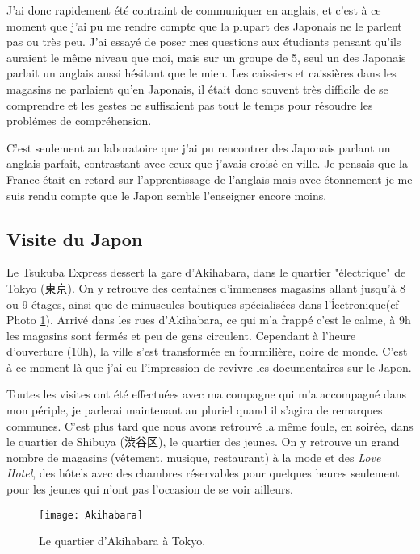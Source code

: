 \documentclass[11pt,journal]{RapportFR}
\begin{document}
\begin{CJK*}{UTF8}{min}
J'ai donc rapidement \'et\'e contraint de communiquer en anglais, et c'est \`a ce moment que j'ai pu me rendre compte que la plupart des Japonais ne le parlent pas ou tr\`es peu. J'ai essay\'e de poser mes questions aux \'etudiants pensant qu'ils auraient le m\^eme niveau que moi, mais sur un groupe de 5, seul un des Japonais parlait un anglais aussi h\'esitant que le mien. Les caissiers et caissi\`eres dans les magasins ne parlaient qu'en Japonais, il \'etait donc souvent tr\`es difficile de se comprendre et les gestes ne suffisaient pas tout le temps pour r\'esoudre les probl\'emes de compr\'ehension.

C'est seulement au laboratoire que j'ai pu rencontrer des Japonais parlant un anglais parfait, contrastant avec ceux que j'avais crois\'e en ville.
Je pensais que la France \'etait en retard sur l'apprentissage de l'anglais mais avec \'etonnement je me suis rendu compte que le Japon semble l'enseigner encore moins. 


\subsection{Visite du Japon}

Le Tsukuba Express dessert la gare d'Akihabara, dans le quartier "\'electrique" de Tokyo (東京). On y retrouve des centaines d'immenses magasins allant jusqu'\`a 8 ou 9 \'etages, ainsi que de minuscules boutiques sp\'ecialis\'ees dans l'\'lectronique(cf Photo \ref{fig_akihabara}).
Arriv\'e dans les rues d'Akihabara, ce qui m'a frapp\'e c'est le calme, \`a 9h les magasins sont ferm\'es et peu de gens circulent. Cependant \`a l'heure d'ouverture (10h), la ville s'est transform\'ee en fourmili\`ere, noire de monde. C'est \`a ce moment-l\`a que j'ai eu l'impression de revivre les documentaires sur le Japon.

Toutes les visites ont \'et\'e effectu\'ees avec ma compagne qui m'a accompagn\'e dans mon p\'eriple, je parlerai maintenant au pluriel quand il s'agira de remarques communes. C'est plus tard que nous avons retrouv\'e la m\^eme foule, en soir\'ee, dans le quartier de Shibuya (渋谷区), le quartier des jeunes. On y retrouve un grand nombre de magasins (v\^etement, musique, restaurant) \`a la mode et des \textit{Love Hotel}, des h\^otels avec des chambres r\'eservables pour quelques heures seulement pour les jeunes qui n'ont pas l'occasion de se voir ailleurs.

\begin{figure}[!t]
\centering
\texttt{[image: Akihabara]}
\caption{Le quartier d'Akihabara \`a Tokyo.}
\label{fig_akihabara}
\end{figure}


\end{CJK*}
\end{document}
